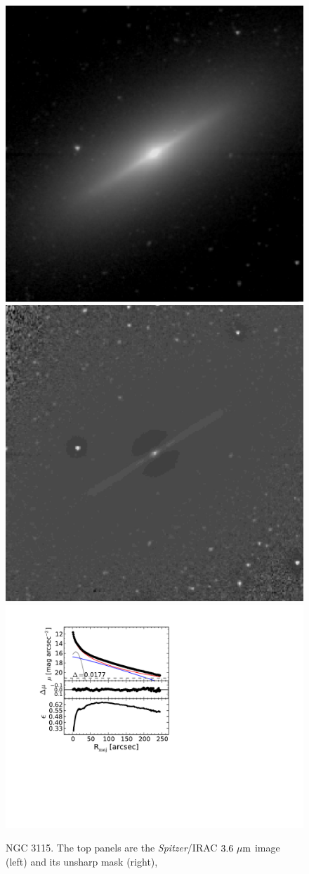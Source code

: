 \documentclass[useAMS,usenatbib,article]{mn2e}
\begin{document}
\begin{figure}
\begin{center}
\includegraphics[width=0.49\columnwidth]{images/n3115_image.jpeg}
\includegraphics[width=0.49\columnwidth]{images/n3115_unsharp.jpeg} \\
\includegraphics[width=1.05\columnwidth]{images/n3115_decomposition.pdf}
\caption{NGC 3115. 
The top panels are the \emph{Spitzer}/IRAC $3.6~\rm \mu m$ image (left) and its unsharp mask (right), 
}
\end{center}
\end{figure}
\end{document}
